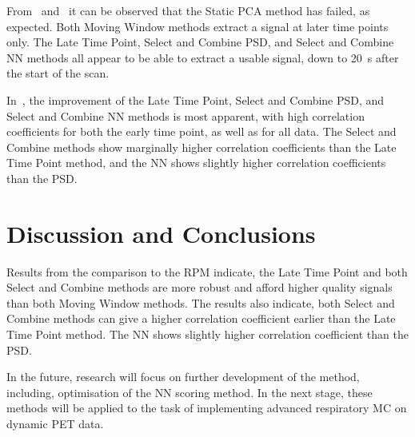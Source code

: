     
    
    
    From~ and~ it can be observed that the Static \acrshort{PCA} method has failed, as expected. Both Moving Window methods extract a signal at later time points only. The Late Time Point, Select and Combine \gls{PSD}, and Select and Combine \gls{NN} methods all appear to be able to extract a usable signal, down to \SI{20}{\second} after the start of the scan.
    
    In~, the improvement of the Late Time Point, Select and Combine \gls{PSD}, and Select and Combine \gls{NN} methods is most apparent, with high correlation coefficients for both the early time point, as well as for all data. The Select and Combine methods show marginally higher correlation coefficients than the Late Time Point method, and the \gls{NN} shows slightly higher correlation coefficients than the \gls{PSD}.
    

\vspace{-0.4cm}

\section{Discussion and Conclusions} \label{sec:discussion_and_conclusions}
    Results from the comparison to the \gls{RPM} indicate, the Late Time Point and both Select and Combine methods are more robust and afford higher quality signals than both Moving Window methods. The results also indicate, both Select and Combine methods can give a higher correlation coefficient earlier than the Late Time Point method. The \gls{NN} shows slightly higher correlation coefficient than the \gls{PSD}.
    
    In the future, research will focus on further development of the method, including, optimisation of the \gls{NN} scoring method. In the next stage, these methods will be applied to the task of implementing advanced respiratory \acrlong{MC} on dynamic \acrshort{PET} data.